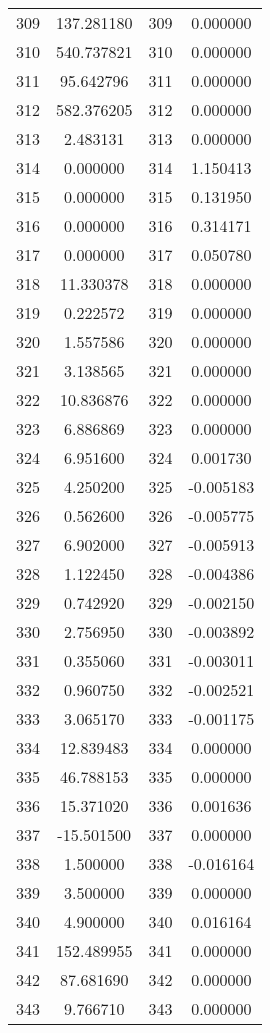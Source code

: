 \documentclass[12pt]{article}
\begin{document}
\begin{longtable}{@{}cccc@{}}
309 & 137.281180 & 309 & 0.000000 \\
310 & 540.737821 & 310 & 0.000000 \\
311 & 95.642796 & 311 & 0.000000 \\
312 & 582.376205 & 312 & 0.000000 \\
313 & 2.483131 & 313 & 0.000000 \\
314 & 0.000000 & 314 & 1.150413 \\
315 & 0.000000 & 315 & 0.131950 \\
316 & 0.000000 & 316 & 0.314171 \\
317 & 0.000000 & 317 & 0.050780 \\
318 & 11.330378 & 318 & 0.000000 \\
319 & 0.222572 & 319 & 0.000000 \\
320 & 1.557586 & 320 & 0.000000 \\
321 & 3.138565 & 321 & 0.000000 \\
322 & 10.836876 & 322 & 0.000000 \\
323 & 6.886869 & 323 & 0.000000 \\
324 & 6.951600 & 324 & 0.001730 \\
325 & 4.250200 & 325 & -0.005183 \\
326 & 0.562600 & 326 & -0.005775 \\
327 & 6.902000 & 327 & -0.005913 \\
328 & 1.122450 & 328 & -0.004386 \\
329 & 0.742920 & 329 & -0.002150 \\
330 & 2.756950 & 330 & -0.003892 \\
331 & 0.355060 & 331 & -0.003011 \\
332 & 0.960750 & 332 & -0.002521 \\
333 & 3.065170 & 333 & -0.001175 \\
334 & 12.839483 & 334 & 0.000000 \\
335 & 46.788153 & 335 & 0.000000 \\
336 & 15.371020 & 336 & 0.001636 \\
337 & -15.501500 & 337 & 0.000000 \\
338 & 1.500000 & 338 & -0.016164 \\
339 & 3.500000 & 339 & 0.000000 \\
340 & 4.900000 & 340 & 0.016164 \\
341 & 152.489955 & 341 & 0.000000 \\
342 & 87.681690 & 342 & 0.000000 \\
343 & 9.766710 & 343 & 0.000000 \\

\end{longtable}
\end{document}
